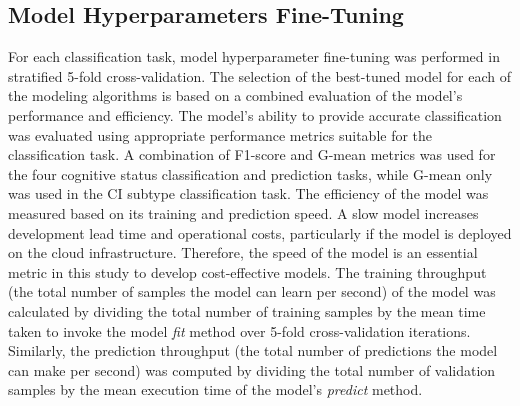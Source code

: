 \subsection{Model Hyperparameters Fine-Tuning}
For each classification task, model hyperparameter fine-tuning was performed in stratified 5-fold cross-validation. The selection of the best-tuned model for each of the modeling algorithms is based on a combined evaluation of the model's performance and efficiency. The model's ability to provide accurate classification was evaluated using appropriate performance metrics suitable for the classification task. A combination of F1-score and G-mean metrics was used for the four cognitive status classification and prediction tasks, while G-mean only was used in the CI subtype classification task. The efficiency of the model was measured based on its training and prediction speed. A slow model increases development lead time and operational costs, particularly if the model is deployed on the cloud infrastructure. Therefore, the speed of the model is an essential metric in this study to develop cost-effective models. The training throughput (the total number of samples the model can learn per second) of the model was calculated by dividing the total number of training samples by the mean time taken to invoke the model \textit{fit} method over 5-fold cross-validation iterations. Similarly, the prediction throughput (the total number of predictions the model can make per second) was computed by dividing the total number of validation samples by the mean execution time of the model's \textit{predict} method.

